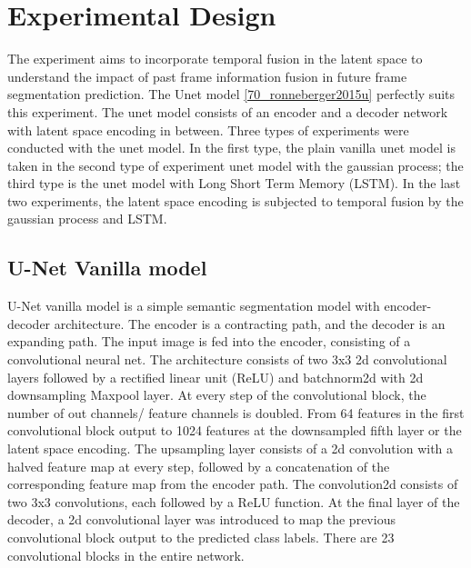     \section{Experimental Design}
    
    The experiment aims to incorporate temporal fusion in the latent space to understand the impact of past frame information fusion in future frame segmentation prediction. The Unet model \ref{70_ronneberger2015u} perfectly suits this experiment. The unet model consists of an encoder and a decoder network with latent space encoding in between. Three types of experiments were conducted with the unet model. In the first type, the plain vanilla unet model is taken in the second type of experiment unet model with the gaussian process; the third type is the unet model with Long Short Term Memory (LSTM). In the last two experiments, the latent space encoding is subjected to temporal fusion by the gaussian process and LSTM.   
    
    \subsection{U-Net Vanilla model}
    
	U-Net vanilla model is a simple semantic segmentation model with encoder-decoder architecture. The encoder is a contracting path, and the decoder is an expanding path. The input image is fed into the encoder, consisting of a convolutional neural net. The architecture consists of two 3x3 2d convolutional layers followed by a rectified linear unit (ReLU) and batchnorm2d with 2d downsampling Maxpool layer. At every step of the convolutional block, the number of out channels/ feature channels is doubled. From 64 features in the first convolutional block output to 1024 features at the downsampled fifth layer or the latent space encoding. The upsampling layer consists of a 2d convolution with a halved feature map at every step, followed by a concatenation of the corresponding feature map from the encoder path. The convolution2d consists of two 3x3 convolutions, each followed by a ReLU function. At the final layer of the decoder, a 2d convolutional layer was introduced to map the previous convolutional block output to the predicted class labels. There are 23 convolutional blocks in the entire network.    
	
